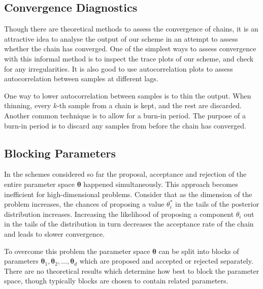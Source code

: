 \subsection*{Convergence Diagnostics}
\label{sssec:convergence_diagnostics}
Though there are theoretical methods to assess the convergence of chains, it is an attractive idea to analyse the output of our scheme in an attempt to assess whether the chain has converged. One of the simplest ways to assess convergence with this informal method is to inspect the trace plots of our scheme, and check for any irregularities. It is also good to use autocorrelation plots to assess autocorrelation between samples at different lags.

One way to lower autocorrelation between samples is to thin the output. When thinning, every $k$-th sample from a chain is kept, and the rest are discarded. Another common technique is to allow for a burn-in period. The purpose of a burn-in period is to discard any samples from before the chain has converged.

\subsection*{Blocking Parameters}
\label{sssec:blocking_parameters}
In the schemes considered so far the proposal, acceptance and rejection of the entire parameter space $\bm{\theta}$ happened simultaneously. This approach becomes inefficient for high-dimensional problems. Consider that as the dimension of the problem increases, the chances of proposing a value $\theta_i^*$ in the tails of the posterior distribution increases. Increasing the likelihood of proposing a component $\theta_i$ out in the tails of the distribution in turn decreases the acceptance rate of the chain and leads to slower convergence.

To overcome this problem the parameter space $\bm{\theta}$ can be split into blocks of parameters $\bm{\theta}_1, \bm{\theta}_2, \dots, \bm{\theta}_d$ which are proposed and accepted or rejected separately. There are no theoretical results which determine how best to block the parameter space, though typically blocks are chosen to contain related parameters.
